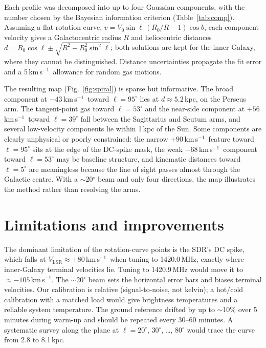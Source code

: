 \documentclass[aip,apl,reprint,amsmath,amssymb]{revtex4-2}
\newcommand{\kms}{km\,s$^{-1}$}
\newcommand{\vlsr}{V_\mathrm{LSR}}
\begin{document}
Each profile was decomposed into up to four Gaussian components, with the number chosen by the Bayesian information criterion (Table~\ref{tab:comp}). Assuming a flat rotation curve, $v = V_0 \sin\ell\,(R_0/R - 1)\cos b$, each component velocity gives a Galactocentric radius $R$ and heliocentric distances $d = R_0\cos\ell \pm \sqrt{R^2 - R_0^2\sin^2\ell}$; both solutions are kept for the inner Galaxy, where they cannot be distinguished. Distance uncertainties propagate the fit error and a 5\,\kms\ allowance for random gas motions.

The resulting map (Fig.~\ref{fig:spiral}) is sparse but informative. The broad component at $-43$\,\kms\ toward $\ell = 95^\circ$ lies at $d \approx 5.2$\,kpc, on the Perseus arm. The tangent-point gas toward $\ell = 53^\circ$ and the near-side component at $+56$\,\kms\ toward $\ell = 39^\circ$ fall between the Sagittarius and Scutum arms, and several low-velocity components lie within 1\,kpc of the Sun. Some components are clearly unphysical or poorly constrained: the narrow $+90$\,\kms\ feature toward $\ell = 95^\circ$ sits at the edge of the DC-spike mask, the weak $-68$\,\kms\ component toward $\ell = 53^\circ$ may be baseline structure, and kinematic distances toward $\ell = 5^\circ$ are meaningless because the line of sight passes almost through the Galactic centre. With a $\sim$20$^\circ$ beam and only four directions, the map illustrates the method rather than resolving the arms.

\section{Limitations and improvements}

The dominant limitation of the rotation-curve points is the SDR's DC spike, which falls at $\vlsr \approx +80$\,\kms\ when tuning to 1420.0\,MHz, exactly where inner-Galaxy terminal velocities lie. Tuning to 1420.9\,MHz would move it to $\approx -105$\,\kms. The $\sim$20$^\circ$ beam sets the horizontal error bars and biases terminal velocities. Our calibration is relative (signal-to-noise, not kelvin); a hot/cold calibration with a matched load would give brightness temperatures and a reliable system temperature. The ground reference drifted by up to $\sim$10\% over 5 minutes during warm-up and should be repeated every 30--60 minutes. A systematic survey along the plane at $\ell = 20^\circ$, 30$^\circ$, \dots, 80$^\circ$ would trace the curve from 2.8 to 8.1\,kpc.
\end{document}

